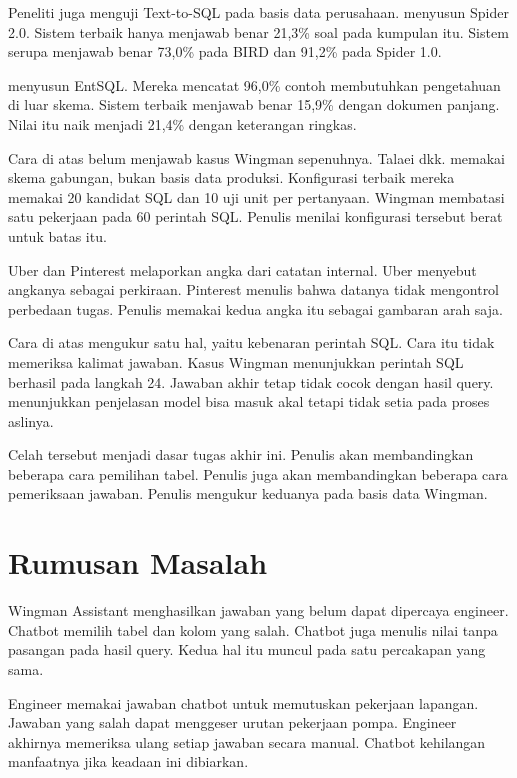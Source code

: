 Peneliti juga menguji Text-to-SQL pada basis data perusahaan. \textcite{lei2025spider20evaluatinglanguage} menyusun Spider 2.0. Sistem terbaik hanya menjawab benar 21,3\% soal pada kumpulan itu. Sistem serupa menjawab benar 73,0\% pada BIRD dan 91,2\% pada Spider 1.0.

\textcite{liao2026entsqlbenchmarkgroundingtexttosql} menyusun EntSQL. Mereka mencatat 96,0\% contoh membutuhkan pengetahuan di luar skema. Sistem terbaik menjawab benar 15,9\% dengan dokumen panjang. Nilai itu naik menjadi 21,4\% dengan keterangan ringkas.

Cara di atas belum menjawab kasus Wingman sepenuhnya. Talaei dkk. memakai skema gabungan, bukan basis data produksi. Konfigurasi terbaik mereka memakai 20 kandidat SQL dan 10 uji unit per pertanyaan. Wingman membatasi satu pekerjaan pada 60 perintah SQL. Penulis menilai konfigurasi tersebut berat untuk batas itu.

Uber dan Pinterest melaporkan angka dari catatan internal. Uber menyebut angkanya sebagai perkiraan. Pinterest menulis bahwa datanya tidak mengontrol perbedaan tugas. Penulis memakai kedua angka itu sebagai gambaran arah saja.

Cara di atas mengukur satu hal, yaitu kebenaran perintah SQL. Cara itu tidak memeriksa kalimat jawaban. Kasus Wingman menunjukkan perintah SQL berhasil pada langkah 24. Jawaban akhir tetap tidak cocok dengan hasil query. \textcite{NEURIPS2023_ed3fea90} menunjukkan penjelasan model bisa masuk akal tetapi tidak setia pada proses aslinya.

Celah tersebut menjadi dasar tugas akhir ini. Penulis akan membandingkan beberapa cara pemilihan tabel. Penulis juga akan membandingkan beberapa cara pemeriksaan jawaban. Penulis mengukur keduanya pada basis data Wingman.

\section{Rumusan Masalah}
Wingman Assistant menghasilkan jawaban yang belum dapat dipercaya engineer. Chatbot memilih tabel dan kolom yang salah. Chatbot juga menulis nilai tanpa pasangan pada hasil query. Kedua hal itu muncul pada satu percakapan yang sama.

Engineer memakai jawaban chatbot untuk memutuskan pekerjaan lapangan. Jawaban yang salah dapat menggeser urutan pekerjaan pompa. Engineer akhirnya memeriksa ulang setiap jawaban secara manual. Chatbot kehilangan manfaatnya jika keadaan ini dibiarkan.

